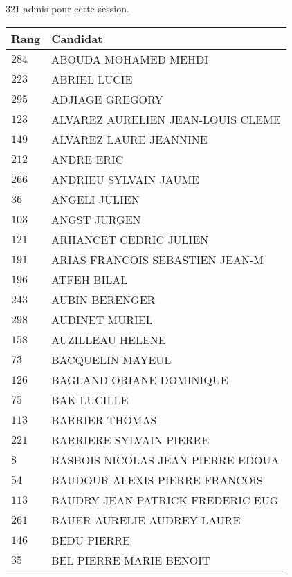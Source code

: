 




  $321$ admis pour cette session.

  \begin{xltabular}{\linewidth}{|l|X|}
    \hline
    \textbf{Rang} & \textbf{Candidat} \\
    \hline
    $284$ & ABOUDA MOHAMED MEHDI \\
    \hline
    $223$ & ABRIEL LUCIE \\
    \hline
    $295$ & ADJIAGE GREGORY \\
    \hline
    $123$ & ALVAREZ AURELIEN JEAN-LOUIS CLEME \\
    \hline
    $149$ & ALVAREZ LAURE JEANNINE \\
    \hline
    $212$ & ANDRE ERIC \\
    \hline
    $266$ & ANDRIEU SYLVAIN JAUME \\
    \hline
    $36$ & ANGELI JULIEN \\
    \hline
    $103$ & ANGST JURGEN \\
    \hline
    $121$ & ARHANCET CEDRIC JULIEN \\
    \hline
    $191$ & ARIAS FRANCOIS SEBASTIEN JEAN-M \\
    \hline
    $196$ & ATFEH BILAL \\
    \hline
    $243$ & AUBIN BERENGER \\
    \hline
    $298$ & AUDINET MURIEL \\
    \hline
    $158$ & AUZILLEAU HELENE \\
    \hline
    $73$ & BACQUELIN MAYEUL \\
    \hline
    $126$ & BAGLAND ORIANE DOMINIQUE \\
    \hline
    $75$ & BAK LUCILLE \\
    \hline
    $113$ & BARRIER THOMAS \\
    \hline
    $221$ & BARRIERE SYLVAIN PIERRE \\
    \hline
    $8$ & BASBOIS NICOLAS JEAN-PIERRE EDOUA \\
    \hline
    $54$ & BAUDOUR ALEXIS PIERRE FRANCOIS \\
    \hline
    $113$ & BAUDRY JEAN-PATRICK FREDERIC EUG \\
    \hline
    $261$ & BAUER AURELIE AUDREY LAURE \\
    \hline
    $146$ & BEDU PIERRE \\
    \hline
    $35$ & BEL PIERRE MARIE BENOIT \\

\end{xltabular}
